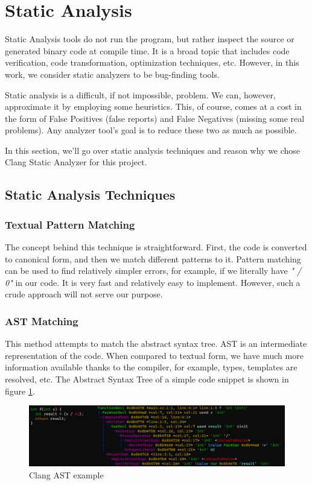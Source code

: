 \section{Static Analysis}
Static Analysis tools do not run the program, but rather inspect the source or generated binary code at compile time.
It is a broad topic that includes code verification, code transformation, optimization techniques, etc.
However, in this work, we consider static analyzers to be bug-finding tools. 

Static analysis is a difficult, if not impossible, problem.
We can, however, approximate it by employing some heuristics.
This, of course, comes at a cost in the form of False Positives (false reports) and False Negatives (missing some real problems).
Any analyzer tool's goal is to reduce these two as much as possible. 

In this section, we'll go over static analysis techniques and reason why we chose Clang Static Analyzer \cite{clangsa} for this project. 

\subsection{Static Analysis Techniques}

\subsubsection{Textual Pattern Matching}
The concept behind this technique is straightforward. First, the code is converted to canonical form, and then we match different patterns to it. Pattern matching can be used to find relatively simpler errors, for example, if we literally have \emph{" / 0"} in our code. It is very fast and relatively easy to implement. However, such a crude approach will not serve our purpose. 

\subsubsection{AST Matching}
This method attempts to match the abstract syntax tree. AST is an intermediate representation of the code. When compared to textual form, we have much more information available thanks to the compiler, for example, types, templates are resolved, etc. 
The Abstract Syntax Tree of a simple code snippet is shown in figure \ref{fig:clang-ast}. 

\begin{figure}[H]
	\centering
	\includegraphics[width=\textwidth]{images/AST_example.png}
	\caption{Clang AST example}
	\label{fig:clang-ast}
\end{figure}


